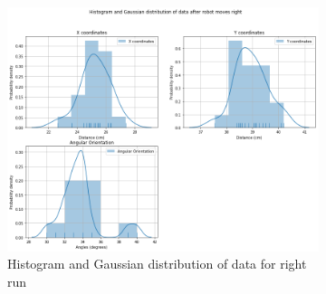 \documentclass[10pt,a4paper]{article}
\begin{document}
			\begin{figure}[H]
			 	\begin{subfigure}{\textwidth}
			 		\centering
			 		\includegraphics[width=\linewidth]{img/histplot_rt.png}
			 		\caption{Histogram and Gaussian distribution of data for right run}
			 	\end{subfigure}
			 	\caption{}%
			 \end{figure}	
			
\end{document}
